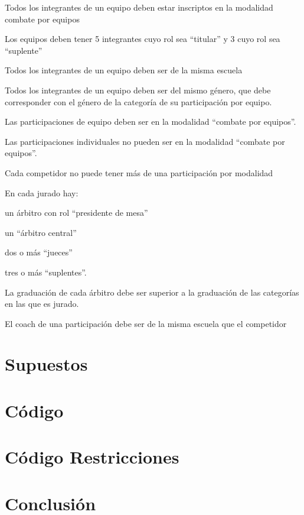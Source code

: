 \documentclass[a4paper]{article}
\begin{document}
Todos los integrantes de un equipo deben estar inscriptos en la modalidad combate por equipos

Los equipos deben tener 5 integrantes cuyo rol sea “titular” y 3 cuyo rol sea “suplente”

Todos los integrantes de un equipo deben ser de la misma escuela

Todos los integrantes de un equipo deben ser del mismo género, que debe corresponder con el género de la categoría de su participación por equipo.

Las participaciones de equipo deben ser en la modalidad “combate por equipos”.

Las participaciones individuales no pueden ser en la modalidad “combate por equipos”.

Cada competidor no puede tener más de una participación por modalidad

En cada jurado hay:

un árbitro con rol “presidente de mesa”

un “árbitro central”

dos o más “jueces”

tres o más “suplentes”.

La graduación de cada árbitro debe ser superior a la graduación de las categorías en las que es jurado. 

El coach de una participación debe ser de la misma escuela que el competidor

\section{Supuestos}

\section{Código}

\section{Código Restricciones}

\section{Conclusión}

\newpage
\end{document}
